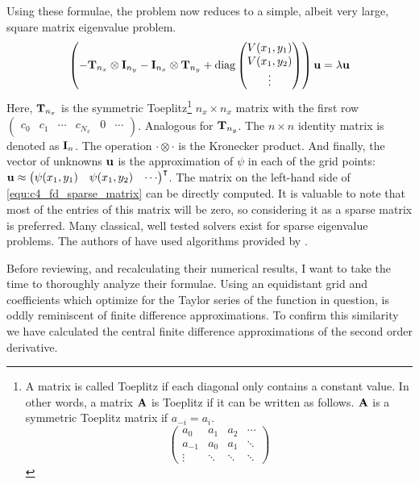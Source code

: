 Using these formulae, the problem now reduces to a simple, albeit very large, square matrix eigenvalue problem.
\begin{equation}\label{equ:c4_fd_sparse_matrix}
    \left(-\vb{T}_{n_x} \otimes \vb{I}_{n_y} - \vb{I}_{n_x} \otimes \vb{T}_{n_y} +  \operatorname{diag}\begin{pmatrix}V(x_1, y_1) \\ V(x_1, y_2) \\ \vdots \end{pmatrix} \right)\vb{u} = \lambda \vb{u}
\end{equation}
Here, $\vb{T}_{n_x}$ is the symmetric Toeplitz\footnote{A matrix is called Toeplitz if each diagonal only contains a constant value. In other words, a matrix $\vb{A}$ is Toeplitz if it can be written as follows. $\vb{A}$ is a symmetric Toeplitz matrix if $a_{-i} = a_i$. $$\begin{pmatrix} a_0 & a_1 & a_2 & \cdots \\ a_{-1} & a_0 & a_1 & \ddots \\ \vdots & \ddots & \ddots & \ddots \end{pmatrix}$$} $n_x \times n_x$ matrix with the first row $\begin{pmatrix} c_0 & c_1 & \cdots & c_{N_x} & 0 & \cdots \end{pmatrix}$. Analogous for $\vb{T}_{n_y}$. The $n\times n$ identity matrix is denoted as $\vb{I}_n$. The operation $\cdot \otimes \cdot$ is the Kronecker product. And finally, the vector of unknowns $\vb{u}$ is the approximation of $\psi$ in each of the grid points: $\vb{u} \approx {\begin{pmatrix} \psi(x_1, y_1) & \psi(x_1, y_2) & \cdots \end{pmatrix}}^\intercal$. The matrix on the left-hand side of \eqref{equ:c4_fd_sparse_matrix} can be directly computed. It is valuable to note that most of the entries of this matrix will be zero, so considering it as a sparse matrix is preferred. Many classical, well tested solvers exist for sparse eigenvalue problems. The authors of \cite{wang_new_2009} have used algorithms provided by \mathematica{} \cite{Mathematica}.

Before reviewing, and recalculating their numerical results, I want to take the time to thoroughly analyze their formulae. Using an equidistant grid and coefficients which optimize for the Taylor series of the function in question, is oddly reminiscent of finite difference approximations. To confirm this similarity we have calculated the central finite difference approximations of the second order derivative.

